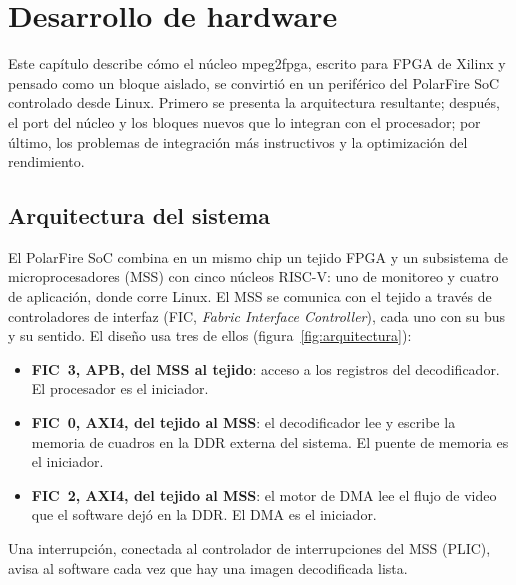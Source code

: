 \chapter{Desarrollo de hardware}
\label{cap:hardware}

Este capítulo describe cómo el núcleo mpeg2fpga, escrito para FPGA de Xilinx
y pensado como un bloque aislado, se convirtió en un periférico del
PolarFire SoC controlado desde Linux. Primero se presenta la arquitectura
resultante; después, el port del núcleo y los bloques nuevos que lo integran
con el procesador; por último, los problemas de integración más
instructivos y la optimización del rendimiento.

\section{Arquitectura del sistema}
\label{sec:arquitectura}

El PolarFire SoC combina en un mismo chip un tejido FPGA y un subsistema de
microprocesadores (MSS) con cinco núcleos RISC-V: uno de monitoreo y cuatro
de aplicación, donde corre Linux. El MSS se comunica con el tejido a través
de controladores de interfaz (FIC, \emph{Fabric Interface Controller}), cada
uno con su bus y su sentido. El diseño usa tres de ellos
(figura~\ref{fig:arquitectura}):

\begin{itemize}
  \item \textbf{FIC~3, APB, del MSS al tejido}: acceso a los registros del
    decodificador. El procesador es el iniciador.
  \item \textbf{FIC~0, AXI4, del tejido al MSS}: el decodificador lee y
    escribe la memoria de cuadros en la DDR externa del sistema. El puente de
    memoria es el iniciador.
  \item \textbf{FIC~2, AXI4, del tejido al MSS}: el motor de DMA lee el flujo
    de video que el software dejó en la DDR. El DMA es el iniciador.
\end{itemize}

Una interrupción, conectada al controlador de interrupciones del MSS (PLIC),
avisa al software cada vez que hay una imagen decodificada lista.

